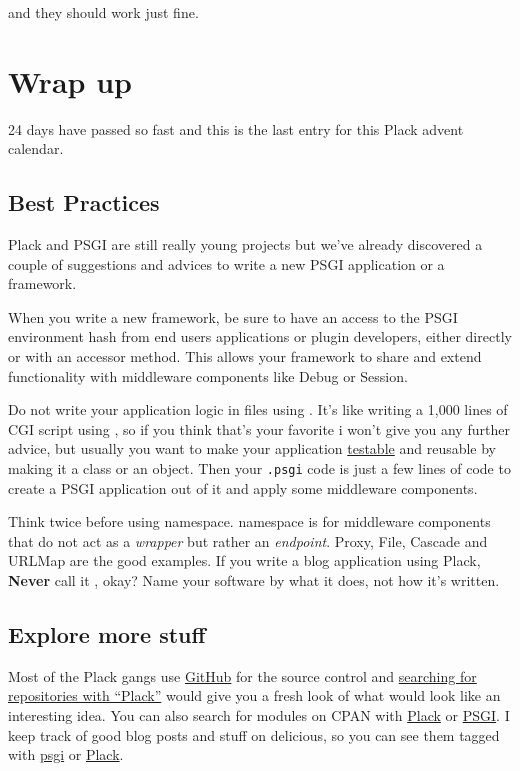 %
and they should work just fine.

\chapter{Wrap up}\label{day-24-wrap-up}

24 days have passed so fast and this is the last entry for this Plack
advent calendar.

\section{Best Practices}\label{best-practices}

Plack and PSGI are still really young projects but we've already
discovered a couple of suggestions and advices to write a new PSGI
application or a framework.

When you write a new framework, be sure to have an access to the PSGI
environment hash from end users applications or plugin developers,
either directly or with an accessor method. This allows your framework
to share and extend functionality with middleware components like Debug
or Session.

Do not write your application logic in  files using
. It's like writing a 1{,}000 lines of CGI script using
, so if you think that's your favorite i won't give you any
further advice, but usually you want to make your application
\href{http://advent.plackperl.org/2009/12/day-13-use-placktest-to-test-your-application.html}{testable}
and reusable by making it a class or an object. Then your
\lstinline!.psgi! code is just a few lines of code to create a PSGI
application out of it and apply some middleware components.

Think twice before using  namespace.  namespace
is for middleware components that do not act as a \emph{wrapper} but
rather an \emph{endpoint}. Proxy, File, Cascade and URLMap are the good
examples. If you write a blog application using Plack, \textbf{Never}
call it , okay? Name your software by what it does, not
how it's written.

\section{Explore more stuff}\label{explore-more-stuff}

Most of the Plack gangs use \href{http://github.com/}{GitHub} for the
source control and
\href{http://github.com/search?langOverride=\&q=plack\&repo=\&start_value=1\&type=Repositories}{searching
for repositories with ``Plack''} would give you a fresh look of what
would look like an interesting idea. You can also search for modules on
CPAN with
\href{http://search.cpan.org/search?query=plack\&mode=module}{Plack} or
\href{http://search.cpan.org/search?query=psgi\&mode=module}{PSGI}. I
keep track of good blog posts and stuff on delicious, so you can see
them tagged with \href{http://delicious.com/miyagawa/psgi}{psgi} or
\href{http://delicious.com/miyagawa/plack}{Plack}.

